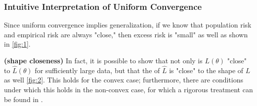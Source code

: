 \documentclass{article}
\newcommand{\bfs}[1]{\textbf{({#1}) }}
\begin{document}
\subsubsection{Intuitive Interpretation of Uniform Convergence}
Since uniform convergence implies generalization, if we know that population risk and empirical risk are always "close," then excess risk is "small" as well as shown in \cref{fig:1}. 
\begin{rema}\bfs{shape closeness}
In fact, it is possible to show that not only is $L(\theta)$ "close" to $\hat{L}(\theta)$ for sufficiently large data, but that the  of $\hat{L}$ is "close" to the shape of $L$ as well \cref{fig:2}. This holds for the convex case; furthermore, there are conditions under which this holds in the non-convex case, for which a rigorous treatment can be found in \cite{mei2016landscape}.
\end{rema}
\end{document}
